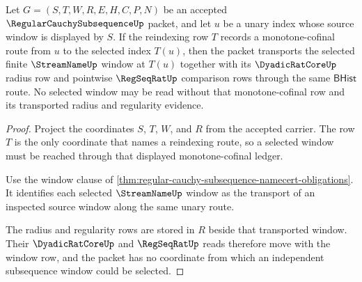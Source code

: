 \begin{theorem}
\label{thm:regular-cauchy-subsequence-monotone-cofinal-window-transport}
Let $G=(S,T,W,R,E,H,C,P,N)$ be an accepted $\RegularCauchySubsequenceUp$ packet, and let $u$ be a unary index whose source window is displayed by $S$. If the reindexing row $T$ records a monotone-cofinal route from $u$ to the selected index $T(u)$, then the packet transports the selected finite $\StreamNameUp$ window at $T(u)$ together with its $\DyadicRatCoreUp$ radius row and pointwise $\RegSeqRatUp$ comparison rows through the same $\mathsf{BHist}$ route. No selected window may be read without that monotone-cofinal row and its transported radius and regularity evidence.
\end{theorem}
\begin{proof}
Project the coordinates $S$, $T$, $W$, and $R$ from the accepted carrier. The row $T$ is the only coordinate that names a reindexing route, so a selected window must be reached through that displayed monotone-cofinal ledger.

Use the window clause of \autoref{thm:regular-cauchy-subsequence-namecert-obligations}. It identifies each selected $\StreamNameUp$ window as the transport of an inspected source window along the same unary route.

The radius and regularity rows are stored in $R$ beside that transported window. Their $\DyadicRatCoreUp$ and $\RegSeqRatUp$ reads therefore move with the window row, and the packet has no coordinate from which an independent subsequence window could be selected.
\end{proof}

